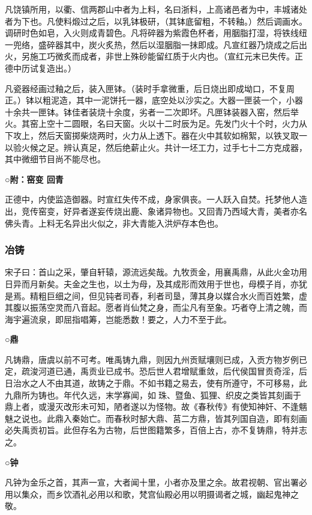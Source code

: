 \documentclass[]{article}
\begin{document}
凡饶镇所用，以衢、信两郡山中者为上料，名曰浙料，上高诸邑者为中，丰城诸处者为下也。凡使料煅过之后，以乳钵极研，（其钵底留粗，不转釉。）然后调画水。调研时色如皂，入火则成青碧色。凡将碎器为紫霞色杯者，用胭脂打湿，将铁线纽一兜络，盛碎器其中，炭火炙热，然后以湿胭脂一抹即成。凡宣红器乃烧成之后出火，另施工巧微炙而成者，非世上殊砂能留红质于火内也。（宣红元末已失传。正德中历试复造出。）

凡瓷器经画过釉之后，装入匣钵。（装时手拿微重，后日烧出即成坳口，不复周正。）钵以粗泥造，其中一泥饼托一器，底空处以沙实之。大器一匣装一个，小器十余共一匣钵。钵佳者装烧十余度，劣者一二次即坏。凡匣钵装器入窑，然后举火。其窑上空十二圆眼，名曰天窗。火以十二时辰为足。先发门火十个时，火力从下攻上，然后天窗掷柴烧两时，火力从上透下。器在火中其软如棉絮，以铁叉取一以验火候之足。辨认真足，然后绝薪止火。共计一坯工力，过手七十二方克成器，其中微细节目尚不能尽也。

\textbf{○附：窑变 回青}

正德中，内使监造御器。时宣红失传不成，身家俱丧。一人跃入自焚。托梦他人造出，竞传窑变，好异者遂妄传烧出鹿、象诸异物也。又回青乃西域大青，美者亦名佛头青。上料无名异出火似之，非大青能入洪炉存本色也。

\hypertarget{header-n2481}{%
\subsubsection{冶铸}\label{header-n2481}}

宋子曰：首山之采，肇自轩辕，源流远矣哉。九牧贡金，用襄禹鼎，从此火金功用日异而月新矣。夫金之生也，以土为母，及其成形而效用于世也，母模子肖，亦犹是焉。精粗巨细之间，但见钝者司舂，利者司垦，薄其身以媒合水火而百姓繁，虚其腹以振荡空灵而八音起。愿者肖仙梵之身，而尘凡有至象。巧者夺上清之魄，而海宇遍流泉，即屈指唱筹，岂能悉数！要之，人力不至于此。

\textbf{○鼎}

凡铸鼎，唐虞以前不可考。唯禹铸九鼎，则因九州贡赋壤则已成，入贡方物岁例已定，疏浚河道已通，禹贡业已成书。恐后世人君增赋重敛，后代侯国冒贡奇淫，后日治水之人不由其道，故铸之于鼎。不如书籍之易去，使有所遵守，不可移易，此九鼎所为铸也。年代久远，末学寡闻，如珠、暨鱼、狐狸、织皮之类皆其刻画于鼎上者，或漫灭改形未可知，陋者遂以为怪物。故《春秋传》有使知神奸、不逢魑魅之说也。此鼎入秦始亡。而春秋时郜大鼎、莒二方鼎，皆其列国自造，即有刻画必失禹贡初旨。此但存名为古物，后世图籍繁多，百倍上古，亦不复铸鼎，特并志之。

\textbf{○钟}

凡钟为金乐之首，其声一宣，大者闻十里，小者亦及里之余。故君视朝、官出署必用以集众，而乡饮酒礼必用以和歌，梵宫仙殿必用以明摄谒者之城，幽起鬼神之敬。
\end{document}
